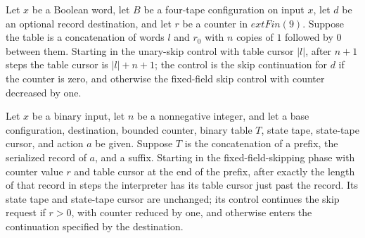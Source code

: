 \begin{lemma}
\label{Turing.timedCut_skip_unary}
\leanok
{}
Let $x$ be a Boolean word, let $B$ be a four-tape configuration on input $x$, let $d$ be
an optional record destination, and let $r$ be a counter in $	ext{Fin}(9)$. Suppose the
table is a concatenation of words $l$ and $r_0$ with $n$ copies of $1$ followed by $0$
between them. Starting in the unary-skip control with table cursor $|l|$, after $n+1$
steps the table cursor is $|l|+n+1$; the control is the skip continuation for $d$ if the
counter is zero, and otherwise the fixed-field skip control with counter decreased by
one.
\end{lemma}

\begin{lemma}
\label{Turing.timedCut_skip_record}
\leanok
{}
Let $x$ be a binary input, let $n$ be a nonnegative integer, and let a base
configuration, destination, bounded counter, binary table $T$, state tape, state-tape
cursor, and action $a$ be given. Suppose $T$ is the concatenation of a prefix, the
serialized record of $a$, and a suffix. Starting in the fixed-field-skipping phase with
counter value $r$ and table cursor at the end of the prefix, after exactly the length of
that record in steps the interpreter has its table cursor just past the record. Its
state tape and state-tape cursor are unchanged; its control continues the skip request
if $r>0$, with counter reduced by one, and otherwise enters the continuation specified
by the destination.
\end{lemma}

